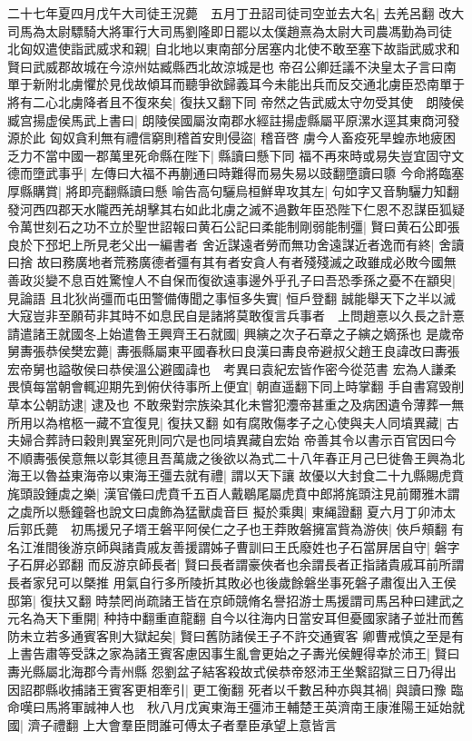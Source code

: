 二十七年夏四月戊午大司徒王況薨　五月丁丑詔司徒司空並去大名|{
	去羌呂翻}
改大司馬為太尉驃騎大將軍行大司馬劉隆即日罷以太僕趙熹為太尉大司農馮勤為司徒　北匈奴遣使詣武威求和親|{
	自北地以東南部分居塞内北使不敢至塞下故詣武威求和賢曰武威郡故城在今涼州姑臧縣西北故涼城是也}
帝召公卿廷議不決皇太子言曰南單于新附北虜懼於見伐故傾耳而聽爭欲歸義耳今未能出兵而反交通北虜臣恐南單于將有二心北虜降者且不復來矣|{
	復扶又翻下同}
帝然之告武威太守勿受其使　朗陵侯臧宫揚虚侯馬武上書曰|{
	朗陵侯國屬汝南郡水經註揚虚縣屬平原漯水逕其東商河發源於此}
匈奴貪利無有禮信窮則稽首安則侵盜|{
	稽音啓}
虜今人畜疫死旱蝗赤地疲困乏力不當中國一郡萬里死命縣在陛下|{
	縣讀曰懸下同}
福不再來時或易失豈宜固守文德而墮武事乎|{
	左傳曰大福不再蒯通曰時難得而易失易以豉翻墮讀曰隳}
今命將臨塞厚縣購賞|{
	將即亮翻縣讀曰懸}
喻告高句驪烏桓鮮卑攻其左|{
	句如字又音駒驪力知翻}
發河西四郡天水隴西羌胡擊其右如此北虜之滅不過數年臣恐陛下仁恩不忍謀臣狐疑令萬世刻石之功不立於聖世詔報曰黄石公記曰柔能制剛弱能制彊|{
	賢曰黄石公即張良於下邳圯上所見老父出一編書者}
舍近謀遠者勞而無功舍遠謀近者逸而有終|{
	舍讀曰捨}
故曰務廣地者荒務廣德者彊有其有者安貪人有者殘殘滅之政雖成必敗今國無善政災變不息百姓驚惶人不自保而復欲遠事邊外乎孔子曰吾恐季孫之憂不在顓臾|{
	見論語}
且北狄尚彊而屯田警備傳聞之事恒多失實|{
	恒戶登翻}
誠能舉天下之半以滅大寇豈非至願苟非其時不如息民自是諸將莫敢復言兵事者　上問趙憙以久長之計憙請遣諸王就國冬上始遣魯王興齊王石就國|{
	興縯之次子石章之子縯之嫡孫也}
是歲帝舅夀張恭侯樊宏薨|{
	夀張縣屬東平國春秋曰良漢曰夀良帝避叔父趙王良諱改曰夀張宏帝舅也謚敬侯曰恭侯溫公避國諱也　考異曰袁紀宏皆作密今從范書}
宏為人謙柔畏慎每當朝會輒迎期先到俯伏待事所上便宜|{
	朝直遥翻下同上時掌翻}
手自書寫毁削草本公朝訪逮|{
	逮及也}
不敢衆對宗族染其化未嘗犯灋帝甚重之及病困遺令薄葬一無所用以為棺柩一藏不宜復見|{
	復扶又翻}
如有腐敗傷孝子之心使與夫人同墳異藏|{
	古夫婦合葬詩曰穀則異室死則同穴是也同墳異藏自宏始}
帝善其令以書示百官因曰今不順夀張侯意無以彰其德且吾萬歲之後欲以為式二十八年春正月己巳徙魯王興為北海王以魯益東海帝以東海王彊去就有禮|{
	謂以天下讓}
故優以大封食二十九縣賜虎賁旄頭設鍾虡之樂|{
	漢官儀曰虎賁千五百人戴鶡尾屬虎賁中郎將旄頭注見前爾雅木謂之虡所以懸鐘磬也說文曰虡飾為猛獸虡音巨}
擬於乘輿|{
	東䋲證翻}
夏六月丁卯沛太后郭氏薨　初馬援兄子壻王磐平阿侯仁之子也王莽敗磐擁富貲為游俠|{
	俠戶頰翻}
有名江淮間後游京師與諸貴戚友善援謂姊子曹訓曰王氏廢姓也子石當屏居自守|{
	磐字子石屏必郢翻}
而反游京師長者|{
	賢曰長者謂豪俠者也余謂長者正指諸貴戚耳前所謂長者家兒可以槩推}
用氣自行多所陵折其敗必也後歲餘磐坐事死磐子肅復出入王侯邸第|{
	復扶又翻}
時禁罔尚疏諸王皆在京師競脩名譽招游士馬援謂司馬呂种曰建武之元名為天下重開|{
	种持中翻重直龍翻}
自今以往海内日當安耳但憂國家諸子並壯而舊防未立若多通賓客則大獄起矣|{
	賢曰舊防諸侯王子不許交通賓客}
卿曹戒慎之至是有上書告肅等受誅之家為諸王賓客慮因事生亂會更始之子夀光侯鯉得幸於沛王|{
	賢曰夀光縣屬北海郡今青州縣}
怨劉盆子結客殺故式侯恭帝怒沛王坐繋詔獄三日乃得出因詔郡縣收捕諸王賓客更相牽引|{
	更工衡翻}
死者以千數呂种亦與其禍|{
	與讀曰豫}
臨命嘆曰馬將軍誠神人也　秋八月戊寅東海王彊沛王輔楚王英濟南王康淮陽王延始就國|{
	濟子禮翻}
上大會羣臣問誰可傅太子者羣臣承望上意皆言


